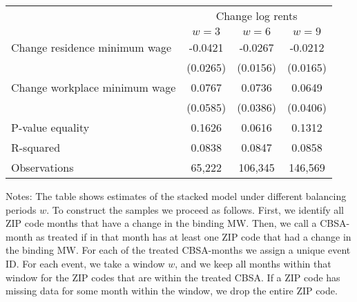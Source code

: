 \begin{table}[]
    \caption{Effect of increase in federal MW to \$9 in January 2020}
    \label{tab:stacked}
    \centering

    \begin{table}[]
        \begin{tabular}{@{}lccc@{}}
        \toprule
                                      & \multicolumn{3}{c}{Change log rents} \\ \cmidrule(l){2-4} 
                                      & $w=3$      & $w=6$     & $w=9 $      \\ \midrule
        Change residence minimum wage & -0.0421        & -0.0267       &  -0.0212        \\
                                      & (0.0265)      & (0.0156)     & (0.0165)       \\
        Change workplace minimum wage & 0.0767        & 0.0736       & 0.0649         \\
                                      & (0.0585)      & (0.0386)     & (0.0406)       \\ \midrule
        P-value equality              & 0.1626        & 0.0616       & 0.1312         \\
        R-squared                     & 0.0838        & 0.0847       & 0.0858         \\
        Observations                  & 65,222       & 106,345      & 146,569        \\ \bottomrule
        \end{tabular}
    \end{table}
    
    \begin{minipage}{.95\textwidth} \footnotesize
        \vspace{2mm}
        Notes: The table shows estimates of the stacked model under different balancing
        periods $w$.
        To construct the samples we proceed as follows. First, we identify all ZIP code months
        that have a change in the binding MW. Then, we call a CBSA-month as treated if in 
        that month has at least one ZIP code that had a change in the binding MW. For each 
        of the treated CBSA-months we assign a unique event ID. For each event, we take a 
        window $w$, and we keep all months within that window for the ZIP codes that are within
        the treated CBSA. If a ZIP code has missing data for some month within the window, 
        we drop the entire ZIP code. 
    \end{minipage}
\end{table}
